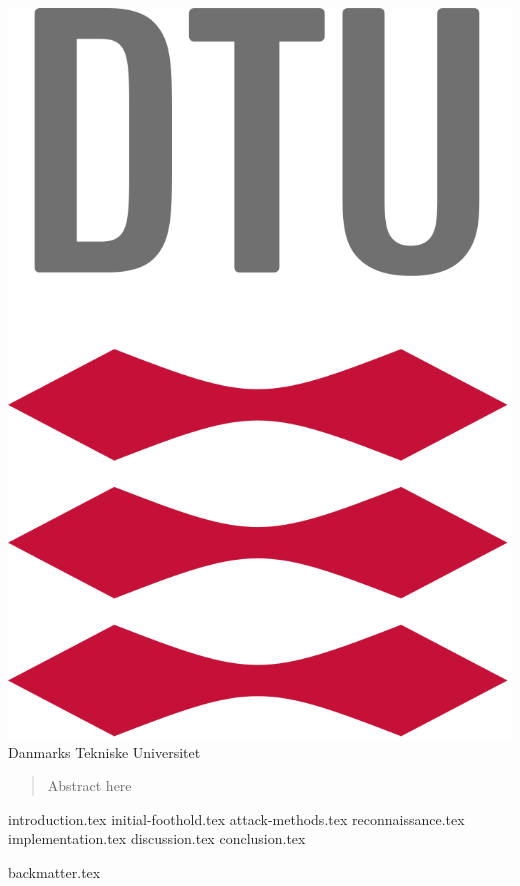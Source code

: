 \documentclass{article}
\begin{document}
\maketitle
\begin{center}
	\vspace{1cm}
	\includegraphics[scale=0.2]{dtulogo}\\
	\LARGE
	Danmarks Tekniske Universitet\\
\end{center}
\newpage


\begin{abstract}
	Abstract here
\end{abstract}
\newpage

\tableofcontents
\newpage

\printglossary[type=\acronymtype,title=Abbreviations]
\newpage


{introduction.tex}
{initial-foothold.tex}
{attack-methods.tex}
{reconnaissance.tex}
{implementation.tex}
{discussion.tex}
{conclusion.tex}

{backmatter.tex}
\end{document}
